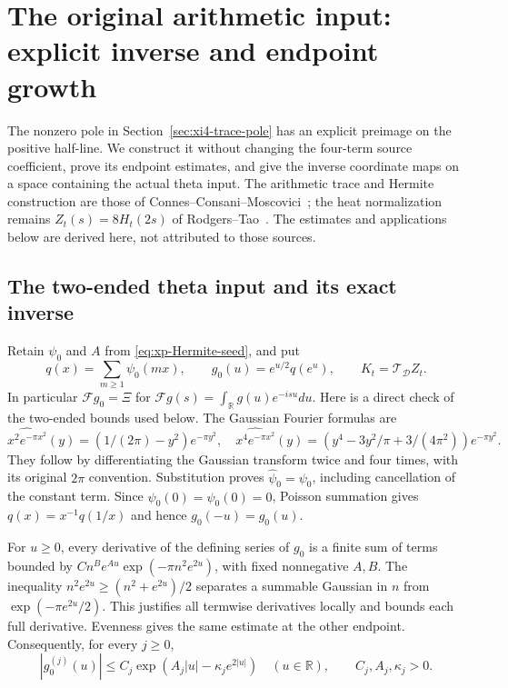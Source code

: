 \section{The original arithmetic input: explicit inverse and endpoint growth}
\label{sec:xi4-mobius-endpoint}

The nonzero pole in Section~\ref{sec:xi4-trace-pole} has an explicit
preimage on the positive half-line. We construct it without changing the
four-term source coefficient, prove its endpoint estimates, and give the
inverse coordinate maps on a space containing the actual theta input.
The arithmetic trace and Hermite construction are those of
Connes--Consani--Moscovici~\cite[\S3.6]{ccmProlate2024}; the heat
normalization remains $Z_t(s)=8H_t(2s)$ of
Rodgers--Tao~\cite[\S1]{rodgersTao2020}. The estimates and applications
below are derived here, not attributed to those sources.

\subsection{The two-ended theta input and its exact inverse}

Retain $\psi_0$ and $A$ from \eqref{eq:xp-Hermite-seed}, and put
\[
 q(x)=\sum_{m\ge1}\psi_0(mx),\qquad
 g_0(u)=e^{u/2}q(e^u),\qquad
 K_t=\mathcal T_{\mathcal D}Z_t.
\]
In particular $\mathscr Fg_0=\Xi$ for
$\mathscr Fg(s)=\int_{\mathbb R}g(u)e^{-isu}du$.
Here is a direct check of the two-ended bounds used below. The Gaussian
Fourier formulas are
\[
 \widehat{x^2e^{-\pi x^2}}(y)=(1/(2\pi)-y^2)e^{-\pi y^2},\quad
 \widehat{x^4e^{-\pi x^2}}(y)
 =(y^4-3y^2/\pi+3/(4\pi^2))e^{-\pi y^2}.
\]
They follow by differentiating the Gaussian transform twice and four
times, with its original $2\pi$ convention. Substitution proves
$\widehat\psi_0=\psi_0$, including cancellation of the constant term.
Since $\psi_0(0)=\widehat\psi_0(0)=0$, Poisson summation gives
$q(x)=x^{-1}q(1/x)$ and hence $g_0(-u)=g_0(u)$.

For $u\ge0$, every derivative of the defining series of $g_0$ is a
finite sum of terms bounded by
$C n^B e^{Au}\exp(-\pi n^2e^{2u})$, with fixed nonnegative $A,B$.
The inequality
$n^2e^{2u}\ge(n^2+e^{2u})/2$ separates a summable Gaussian in $n$
from $\exp(-\pi e^{2u}/2)$. This justifies all termwise derivatives
locally and bounds each full derivative. Evenness gives the same
estimate at the other endpoint. Consequently, for every $j\ge0$,
\begin{equation}\label{eq:xm-superdecay}
 |g_0^{(j)}(u)|\le C_j\exp(A_j|u|-\kappa_j e^{2|u|})
 \quad(u\in\mathbb R),\qquad C_j,A_j,\kappa_j>0.
\end{equation}

